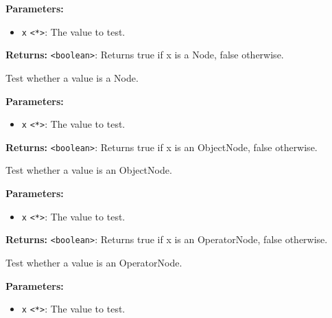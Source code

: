 \documentclass[12pt,a4paper]{article}
\begin{document}
\noindent \textbf{Parameters:}
\begin{itemize}
  \item \texttt{x} \texttt{<*>}: The value to test.
\end{itemize}

\noindent \textbf{Returns:} \texttt{<boolean>}: Returns true if \textasciigrave{}x\textasciigrave{} is a Node, false otherwise.

\noindent Test whether a value is a Node.

\vspace{5mm}
\noindent {}


\noindent \textbf{Parameters:}
\begin{itemize}
  \item \texttt{x} \texttt{<*>}: The value to test.
\end{itemize}

\noindent \textbf{Returns:} \texttt{<boolean>}: Returns true if \textasciigrave{}x\textasciigrave{} is an ObjectNode, false otherwise.

\noindent Test whether a value is an ObjectNode.

\vspace{5mm}
\noindent {}


\noindent \textbf{Parameters:}
\begin{itemize}
  \item \texttt{x} \texttt{<*>}: The value to test.
\end{itemize}

\noindent \textbf{Returns:} \texttt{<boolean>}: Returns true if \textasciigrave{}x\textasciigrave{} is an OperatorNode, false otherwise.

\noindent Test whether a value is an OperatorNode.

\vspace{5mm}
\noindent {}


\noindent \textbf{Parameters:}
\begin{itemize}
  \item \texttt{x} \texttt{<*>}: The value to test.
\end{itemize}
\end{document}
